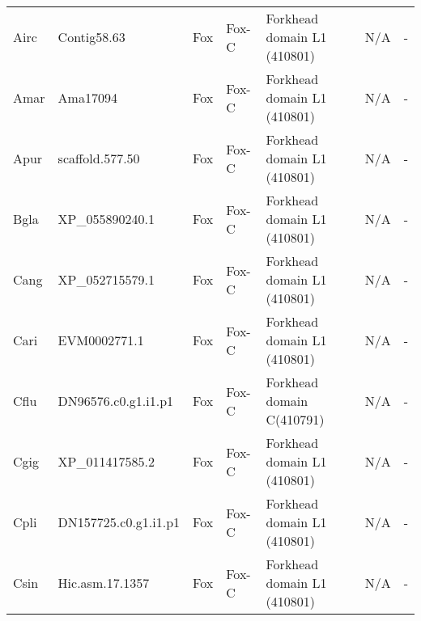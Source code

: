 \documentclass[../main.tex]{subfiles}
\begin{document}
\begin{landscape}
\begin{longtable}{lllllll}
		Airc           & Contig58.63           & Fox            & Fox-C               & Forkhead domain L1 (410801)                 & N/A                                                                    & -                    \\
		Amar           & Ama17094              & Fox            & Fox-C               & Forkhead domain L1 (410801)                 & N/A                                                                    & -                    \\
		Apur           & scaffold.577.50       & Fox            & Fox-C               & Forkhead domain L1 (410801)                 & N/A                                                                    & -                    \\
		Bgla           & XP\_055890240.1       & Fox            & Fox-C               & Forkhead domain L1 (410801)                 & N/A                                                                    & -                    \\
		Cang           & XP\_052715579.1       & Fox            & Fox-C               & Forkhead domain L1 (410801)                 & N/A                                                                    & -                    \\
		Cari           & EVM0002771.1          & Fox            & Fox-C               & Forkhead domain L1 (410801)                 & N/A                                                                    & -                    \\
		Cflu           & DN96576.c0.g1.i1.p1   & Fox            & Fox-C               & Forkhead domain C(410791)                   & N/A                                                                    & -                    \\
		Cgig           & XP\_011417585.2       & Fox            & Fox-C               & Forkhead domain L1 (410801)                 & N/A                                                                    & -                    \\
		Cpli           & DN157725.c0.g1.i1.p1  & Fox            & Fox-C               & Forkhead domain L1 (410801)                 & N/A                                                                    & -                    \\
		Csin           & Hic.asm.17.1357       & Fox            & Fox-C               & Forkhead domain L1 (410801)                 & N/A                                                                    & -                    \\

\end{longtable}
\end{landscape}
\end{document}
